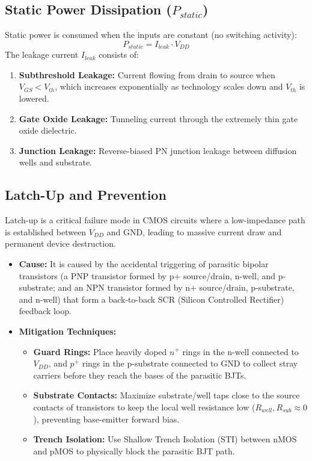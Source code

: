 \documentclass[12pt,a4paper]{article}
\begin{document}
\subsection{Static Power Dissipation (\texorpdfstring{$P_{static}$}{P\_static})}
Static power is consumed when the inputs are constant (no switching activity):
\begin{equation}
  P_{static} = I_{leak} \cdot V_{DD}
\end{equation}
The leakage current $I_{leak}$ consists of:
\begin{enumerate}[label=\arabic*., leftmargin=*]
  \item \textbf{Subthreshold Leakage:} Current flowing from drain to source when $V_{GS} < V_{th}$, which increases exponentially as technology scales down and $V_{th}$ is lowered.
  \item \textbf{Gate Oxide Leakage:} Tunneling current through the extremely thin gate oxide dielectric.
  \item \textbf{Junction Leakage:} Reverse-biased PN junction leakage between diffusion wells and substrate.
\end{enumerate}

\subsection{Latch-Up and Prevention}
Latch-up is a critical failure mode in CMOS circuits where a low-impedance path is established between $V_{DD}$ and GND, leading to massive current draw and permanent device destruction.

\begin{itemize}[leftmargin=*, itemsep=4pt]
  \item \textbf{Cause:} It is caused by the accidental triggering of parasitic bipolar transistors (a PNP transistor formed by p+ source/drain, n-well, and p-substrate; and an NPN transistor formed by n+ source/drain, p-substrate, and n-well) that form a back-to-back SCR (Silicon Controlled Rectifier) feedback loop.
  \item \textbf{Mitigation Techniques:}
    \begin{itemize}[leftmargin=*, itemsep=2.5pt, topsep=2pt]
      \item \textbf{Guard Rings:} Place heavily doped $n^+$ rings in the n-well connected to $V_{DD}$, and $p^+$ rings in the p-substrate connected to GND to collect stray carriers before they reach the bases of the parasitic BJTs.
      \item \textbf{Substrate Contacts:} Maximize substrate/well taps close to the source contacts of transistors to keep the local well resistance low ($R_{well}, R_{sub} \approx 0$), preventing base-emitter forward bias.
      \item \textbf{Trench Isolation:} Use Shallow Trench Isolation (STI) between nMOS and pMOS to physically block the parasitic BJT path.
    \end{itemize}
\end{itemize}
\end{document}
